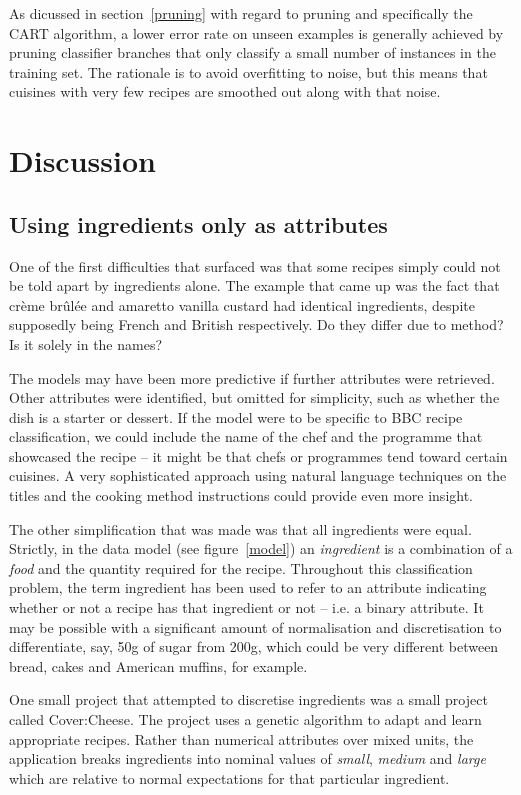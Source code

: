 \documentclass[11pt,a4paper]{article}
\begin{document}
As dicussed in section~\ref{pruning} with regard to pruning and specifically the CART
algorithm, a lower error rate on unseen examples is generally achieved by pruning
classifier branches that only classify a small number of instances in the training set.
The rationale is to avoid overfitting to noise, but this means that cuisines with
very few recipes are smoothed out along with that noise.


\section{Discussion}
\subsection{Using ingredients only as attributes}

One of the first difficulties that surfaced was that some recipes simply could not
be told apart by ingredients alone. The example that came up was the fact that
cr\`eme br\^ul\'ee and amaretto vanilla custard had identical ingredients, despite
supposedly being French and British respectively. Do they differ due to method? Is
it solely in the names?

The models may have been more predictive if further attributes were retrieved.
Other attributes were identified, but omitted for simplicity, such as whether
the dish is a starter or dessert. If the model were to be specific to BBC recipe
classification, we could include the name of the chef and the programme
that showcased the recipe -- it might be that chefs or programmes tend toward
certain cuisines. A very sophisticated approach using natural language techniques
on the titles and the cooking method instructions could provide even more
insight.

The other simplification that was made was that all ingredients were equal. Strictly,
in the data model (see figure~\ref{model}) an \emph{ingredient} is a combination of a
\emph{food} and the quantity required for the recipe. Throughout this classification
problem, the term ingredient has been used to refer to an attribute indicating
whether or not a recipe has that ingredient or not -- i.e. a binary attribute. It may
be possible with a significant amount of normalisation and discretisation to
differentiate, say, 50g of sugar from 200g, which could be very different between
bread, cakes and American muffins, for example.

One small project that attempted to discretise ingredients was a small project
called Cover:Cheese. \cite{covercheese} The project uses a genetic algorithm
to adapt and learn appropriate recipes. Rather than numerical attributes over
mixed units, the application breaks ingredients into nominal values of \emph{small},
\emph{medium} and \emph{large} which are relative to normal expectations for
that particular ingredient.
\end{document}
